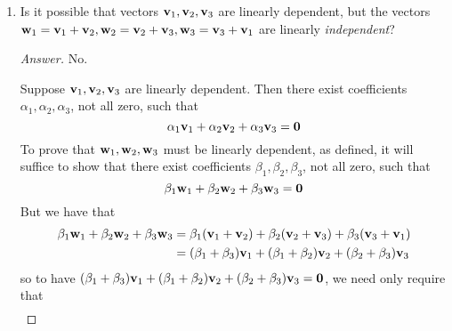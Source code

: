 \documentclass[../psets.tex]{subfiles}
\begin{document}
\begin{enumerate}[label={\textbf{2.\arabic*.}}]
\begin{proof}[Answer]
        Let $\vm_{r+1}$ be any vector that cannot be represented as a linear combination $\sum_{k=1}^r\alpha_k\vm_k$ (we are guaranteed that one exists, because otherwise $\vm_1,\dots,\vm_r$ would be generating). Now suppose for the sake of contradiction that the new list is linearly dependent. Then there exist coefficients $\alpha_1,\dots,\alpha_{r+1}$, not all zero, such that
        \begin{equation*}
            \alpha_1\vm_1+\cdots+\alpha_{r+1}\vm_{r+1} = \bm{0}
        \end{equation*}
        But then
        \begin{equation*}
            \vm_{r+1} = -\frac{\alpha_1}{\alpha_{r+1}}\vm_1-\cdots-\frac{\alpha_r}{\alpha_{r+1}}\vm_r
        \end{equation*}
        so $\vm_{r+1}$ can be expressed as a linear combination of $\vm_1,\dots,\vm_r$, a contradiction.
    \end{proof}
    \item Is it possible that vectors $\mathbf{v}_1,\mathbf{v}_2,\mathbf{v}_3$ are linearly dependent, but the vectors $\mathbf{w}_1=\mathbf{v}_1+\mathbf{v}_2,\mathbf{w}_2=\mathbf{v}_2+\mathbf{v}_3,\mathbf{w}_3=\mathbf{v}_3+\mathbf{v}_1$ are linearly \emph{independent}?
    \begin{proof}[Answer]
        No.\par
        Suppose $\mathbf{v}_1,\mathbf{v}_2,\mathbf{v}_3$ are linearly dependent. Then there exist coefficients $\alpha_1,\alpha_2,\alpha_3$, not all zero, such that
        \begin{equation*}
            \alpha_1\mathbf{v}_1+\alpha_2\mathbf{v}_2+\alpha_3\mathbf{v}_3 = \bm{0}
        \end{equation*}
        To prove that $\mathbf{w}_1,\mathbf{w}_2,\mathbf{w}_3$ must be linearly dependent, as defined, it will suffice to show that there exist coefficients $\beta_1,\beta_2,\beta_3$, not all zero, such that
        \begin{equation*}
            \beta_1\mathbf{w}_1+\beta_2\mathbf{w}_2+\beta_3\mathbf{w}_3 = \bm{0}
        \end{equation*}
        But we have that
        \begin{align*}
            \beta_1\mathbf{w}_1+\beta_2\mathbf{w}_2+\beta_3\mathbf{w}_3 &= \beta_1(\mathbf{v}_1+\mathbf{v}_2)+\beta_2(\mathbf{v}_2+\mathbf{v}_3)+\beta_3(\mathbf{v}_3+\mathbf{v}_1)\\
            &= (\beta_1+\beta_3)\mathbf{v}_1+(\beta_1+\beta_2)\mathbf{v}_2+(\beta_2+\beta_3)\mathbf{v}_3
        \end{align*}
        so to have $(\beta_1+\beta_3)\mathbf{v}_1+(\beta_1+\beta_2)\mathbf{v}_2+(\beta_2+\beta_3)\mathbf{v}_3=\bm{0}$, we need only require that
        \begin{align*}

\end{align*}
\end{proof}
\end{enumerate}
\end{document}
